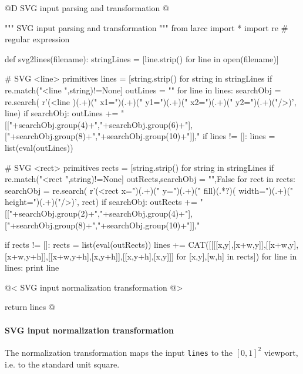 \documentclass[11pt,oneside]{article}    %
\begin{document}
@D SVG input parsing and transformation
@{""" SVG input parsing and transformation """
from larcc import *
import re # regular expression

def svg2lines(filename):
    stringLines = [line.strip() for line in open(filename)]   
    
    # SVG <line> primitives
    lines = [string.strip() for string in stringLines if re.match("<line ",string)!=None]   
    outLines = ""   
    for line in lines:
        searchObj = re.search( r'(<line )(.+)(" x1=")(.+)(" y1=")(.+)(" x2=")(.+)(" y2=")(.+)("/>)', line)
        if searchObj:
            outLines += "[["+searchObj.group(4)+","+searchObj.group(6)+"], ["+searchObj.group(8)+","+searchObj.group(10)+"]],"
    if lines != []:
        lines = list(eval(outLines))
              
    # SVG <rect> primitives
    rects = [string.strip() for string in stringLines if re.match("<rect ",string)!=None]   
    outRects,searchObj = "",False 
    for rect in rects:
        searchObj = re.search( r'(<rect x=")(.+)(" y=")(.+)(" fill)(.*?)( width=")(.+)(" height=")(.+)("/>)', rect)
        if searchObj:
            outRects += "[["+searchObj.group(2)+","+searchObj.group(4)+"], ["+searchObj.group(8)+","+searchObj.group(10)+"]],"
    
    if rects != []:
        rects = list(eval(outRects))
        lines += CAT([[[[x,y],[x+w,y]],[[x+w,y],[x+w,y+h]],[[x+w,y+h],[x,y+h]],[[x,y+h],[x,y]]] for [x,y],[w,h] in rects])
    for line in lines: print line
    
    @< SVG input normalization transformation @>
    
    return lines
@}
    
    
\paragraph{SVG input normalization transformation}
The normalization transformation maps the input \texttt{lines} to the $[0,1]^2$ viewport, i.e. to the standard unit square.
\end{document}

